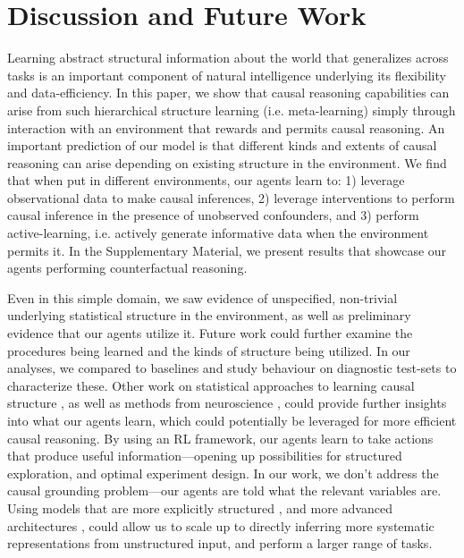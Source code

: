 \section{Discussion and Future Work}

Learning abstract structural information about the world that generalizes across tasks is an important component of natural intelligence underlying its flexibility and data-efficiency. In this paper, we show that causal reasoning capabilities can arise from such hierarchical structure learning (i.e. meta-learning) simply through interaction with an environment that rewards and permits causal reasoning. An important prediction of our model is that different kinds and extents of causal reasoning can arise depending on existing structure in the environment. We find that when put in different environments, our agents learn to: 1) leverage observational data to make causal inferences, 2) leverage interventions to perform causal inference in the presence of unobserved confounders, and 3) perform active-learning, i.e. actively generate informative data when the environment permits it. In the Supplementary Material, we present results that showcase our agents performing counterfactual reasoning. 

Even in this simple domain, we saw evidence of unspecified, non-trivial underlying statistical structure in the environment, as well as preliminary evidence that our agents utilize it. Future work could further examine the procedures being learned and the kinds of structure being utilized. In our analyses, we compared to baselines and study behaviour on diagnostic test-sets to characterize these. Other work on statistical approaches to learning causal structure \citep{bengio2019meta, janzing2009telling, hoyer2009nonlinear}, as well as methods from neuroscience \citep{wang2018}, could provide further insights into what our agents learn, which could potentially be leveraged for more efficient causal reasoning. By using an RL framework, our agents learn to take actions that produce useful information---opening up possibilities for structured exploration, and optimal experiment design. In our work, we don't address the causal grounding problem---our agents are told what the relevant variables are. Using models that are more explicitly structured \citep[e.g.][]{andreas2016neural,battaglia2018relational, ganin2018synthesizing}, and more advanced architectures \citep[e.g.][]{hester2017deep,hessel2018multi,espeholt2018impala}, could allow us to scale up to directly inferring more systematic representations from unstructured input, and perform a larger range of tasks.

